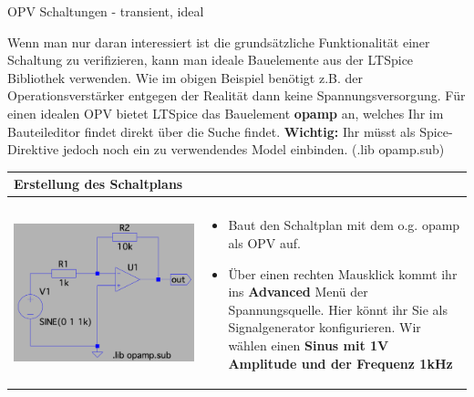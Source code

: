 \begin{frame}[t]{OPV Schaltungen - transient, ideal}
\begin{spacing}{0.6}
\begin{tiny}
  Wenn man nur daran interessiert ist die grundsätzliche Funktionalität einer Schaltung zu verifizieren, kann man ideale
  Bauelemente aus der LTSpice Bibliothek verwenden. Wie im obigen Beispiel benötigt z.B. der Operationsverstärker entgegen der Realität dann keine Spannungsversorgung.
  Für einen idealen OPV bietet LTSpice das Bauelement \textbf{opamp} an, welches Ihr im Bauteileditor findet direkt über die Suche findet. \newline
  \textbf{Wichtig:} Ihr müsst als Spice-Direktive jedoch noch ein zu verwendendes Model einbinden. (.lib opamp.sub)
    \end{tiny} \end{spacing}
    \begin{spacing}{0.9} \begin{tiny}
    \begin{table}[h!]
      \begin{tabular}{p{3cm} p{7cm}}
        \hline
        \textbf{Erstellung des Schaltplans} & \\
        \hline \\
        \begin{minipage}{.3\textwidth}
          \includegraphics[width=0.8\linewidth]{pictures/opamp_1.png}
        \end{minipage} 
        & 
        \begin{minipage}{.7\textwidth}
        \begin{itemize}
          \item Baut den Schaltplan mit dem o.g. opamp als OPV auf. 
          \item Über einen rechten Mausklick kommt ihr ins \textbf{Advanced} Menü der Spannungsquelle. Hier könnt ihr Sie als Signalgenerator konfigurieren. Wir wählen einen \textbf{Sinus mit 1V Amplitude und der Frequenz 1kHz}

\end{itemize}
\end{minipage}
\end{tabular}
\end{table}
\end{tiny}
\end{spacing}
\end{frame}
